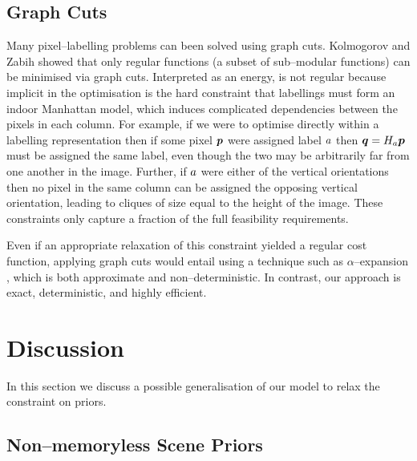 \subsection{Graph Cuts}
Many pixel--labelling problems can been solved using graph
cuts. Kolmogorov and Zabih \cite{Kolmogorov02} showed that only
regular functions (a subset of sub--modular functions) can be
minimised via graph cuts. Interpreted as an energy,
 is not regular because implicit in the
optimisation is the hard constraint that labellings must form an
indoor Manhattan model, which induces complicated dependencies between
the pixels in each column. For example, if we were to optimise
directly within a labelling representation then if some pixel $\Pixel$
were assigned label $\Orient$ then $\OtherPixel=\Hcf\Pixel$ must be
assigned the same label, even though the two may be arbitrarily far
from one another in the image. Further, if $\Orient$ were either of
the vertical orientations then no pixel in the same column can be
assigned the opposing vertical orientation, leading to cliques of size
equal to the height of the image. These constraints only
capture a fraction of the full feasibility requirements.

Even if an appropriate relaxation of this constraint yielded a regular
cost function, applying graph cuts would entail using a technique such
as $\alpha$--expansion \cite{Kolmogorov02}, which is both approximate
and non--deterministic. In contrast, our approach is exact,
deterministic, and highly efficient.

\section{Discussion}

In this section we discuss a possible generalisation of our model to
relax the constraint on priors.

\subsection{Non--memoryless Scene Priors}
\label{sec:other-priors}

